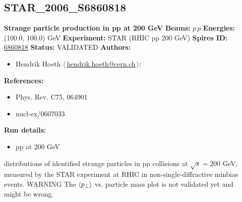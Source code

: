 \subsection[STAR\_2006\_S6860818]{STAR\_2006\_S6860818\,\cite{Abelev:2006cs}}
\textbf{Strange particle production in pp at 200 GeV}\newline
\textbf{Beams:} $p$\,$p$ \newline
\textbf{Energies:} (100.0, 100.0) GeV \newline
\textbf{Experiment:} STAR (RHIC pp 200 GeV) \newline
\textbf{Spires ID:} \href{http://www.slac.stanford.edu/spires/find/hep/www?rawcmd=key+6860818}{6860818}\newline
\textbf{Status:} VALIDATED\newline
\textbf{Authors:}
\begin{itemize}
  \item Hendrik Hoeth $\langle\,$\href{mailto:hendrik.hoeth@cern.ch}{hendrik.hoeth@cern.ch}$\,\rangle$;
\end{itemize}
\textbf{References:}
\begin{itemize}
  \item Phys. Rev. C75, 064901
  \item nucl-ex/0607033
\end{itemize}
\textbf{Run details:}
\begin{itemize}

  \item pp at 200 GeV\end{itemize}

\noindent \pT distributions of identified strange particles in pp collisions at $\sqrt{s} = 200$ GeV, measured by the STAR experiment at RHIC in non-single-diffractive minbias events. WARNING The $\langle p_\perp \rangle$ vs. particle mass plot is not validated yet and might be wrong.

\clearpage


\clearpage

